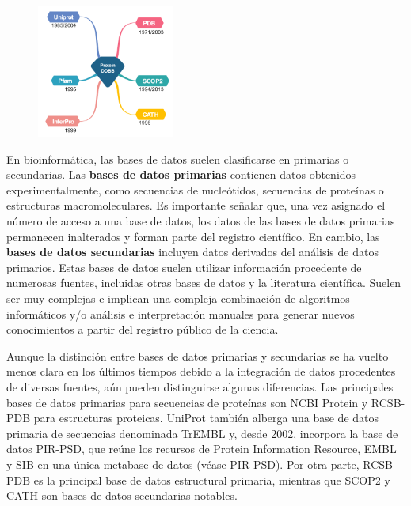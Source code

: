 \begin{figure}[h]
\centering
\includegraphics[width = 0.4\textwidth]{figs/ddbb.png}
\end{figure}

En bioinformática, las bases de datos suelen clasificarse en primarias o secundarias. Las \textbf{bases de datos primarias} contienen datos obtenidos experimentalmente, como secuencias de nucleótidos, secuencias de proteínas o estructuras macromoleculares. Es importante señalar que, una vez asignado el número de acceso a una base de datos, los datos de las bases de datos primarias permanecen inalterados y forman parte del registro científico. En cambio, las \textbf{bases de datos secundarias} incluyen datos derivados del análisis de datos primarios. Estas bases de datos suelen utilizar información procedente de numerosas fuentes, incluidas otras bases de datos y la literatura científica. Suelen ser muy complejas e implican una compleja combinación de algoritmos informáticos y/o análisis e interpretación manuales para generar nuevos conocimientos a partir del registro público de la ciencia.

Aunque la distinción entre bases de datos primarias y secundarias se ha vuelto menos clara en los últimos tiempos debido a la integración de datos procedentes de diversas fuentes, aún pueden distinguirse algunas diferencias. Las principales bases de datos primarias para secuencias de proteínas son NCBI Protein y RCSB-PDB para estructuras proteicas. UniProt también alberga una base de datos primaria de secuencias denominada TrEMBL y, desde 2002, incorpora la base de datos PIR-PSD, que reúne los recursos de Protein Information Resource, EMBL y SIB en una única metabase de datos (véase PIR-PSD). Por otra parte, RCSB-PDB es la principal base de datos estructural primaria, mientras que SCOP2 y CATH son bases de datos secundarias notables.

